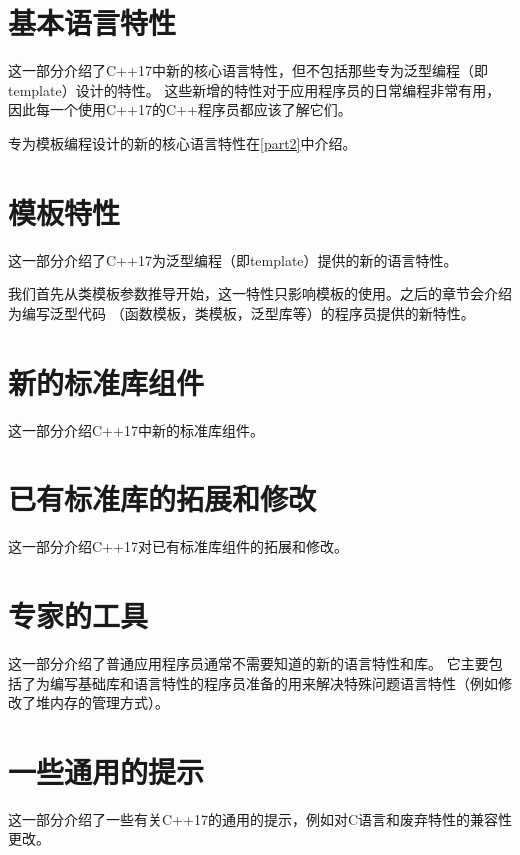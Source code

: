 \documentclass[twoside, 10pt, AutoFakeBold, AutoFakeSlant]{book}
\begin{document}
    \frontmatter
    \pagestyle{front}
    \tableofcontents

    \mainmatter
    \pagestyle{main}


    \part{基本语言特性}\label{part1}
    这一部分介绍了C++17中新的核心语言特性，但不包括那些专为泛型编程（即template）设计的特性。
    这些新增的特性对于应用程序员的日常编程非常有用，因此每一个使用C++17的C++程序员都应该了解它们。

    专为模板编程设计的新的核心语言特性在\autoref{part2}中介绍。

    
    
    
    
    
    
    
    


    \part{模板特性}\label{part2}
    这一部分介绍了C++17为泛型编程（即template）提供的新的语言特性。

    我们首先从类模板参数推导开始，这一特性只影响模板的使用。之后的章节会介绍为编写泛型代码
    （函数模板，类模板，泛型库等）的程序员提供的新特性。

    
    
    
    
    
    


    \part{新的标准库组件}\label{part3}
    这一部分介绍C++17中新的标准库组件。

    
    
    
    
    
    


    \part{已有标准库的拓展和修改}\label{part4}
    这一部分介绍C++17对已有标准库组件的拓展和修改。

    
    
    
    
    
    
    
    


    \part{专家的工具}\label{part5}
    这一部分介绍了普通应用程序员通常不需要知道的新的语言特性和库。
    它主要包括了为编写基础库和语言特性的程序员准备的用来解决特殊问题语言特性（例如修改了堆内存的管理方式）。

    
    
    
    
    


    \part{一些通用的提示}\label{part6}
    这一部分介绍了一些有关C++17的通用的提示，例如对C语言和废弃特性的兼容性更改。
    
    

    \backmatter
\end{document}
